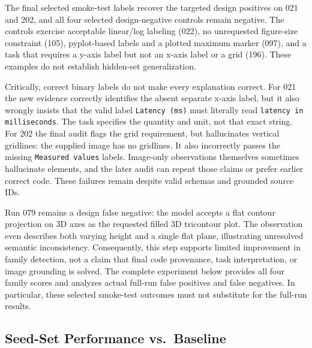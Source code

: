 \documentclass[11pt]{article}
\begin{document}
The final selected smoke-test labels recover the targeted design positives on
021 and 202, and
all four selected design-negative controls remain negative.
The controls exercise acceptable linear/log labeling (022), no unrequested
figure-size constraint (105), pyplot-based labels and a plotted maximum
marker (097), and a task that requires a y-axis label but not an x-axis label
or a grid (196). These examples do not establish hidden-set generalization.

Critically, correct binary labels do not make every explanation correct.
For 021 the new evidence correctly identifies the absent separate x-axis
label, but it also wrongly insists that the valid label \texttt{Latency (ms)}
must literally read \texttt{latency in milliseconds}. The task specifies the
quantity and unit, not that exact string.
For 202 the final audit flags the grid requirement, but hallucinates vertical
gridlines: the supplied image has no gridlines. It also incorrectly passes
the missing \texttt{Measured values} labels.
Image-only observations themselves sometimes hallucinate elements, and the
later audit can repeat those claims or prefer earlier correct code.
These failures remain despite valid schemas and grounded source IDs.

Run 079 remains a design false negative: the model accepts a flat contour
projection on 3D axes as the requested filled 3D tricontour plot.
The observation even describes both varying height and a single flat plane,
illustrating unresolved semantic inconsistency. Consequently, this step
supports limited improvement in family detection, not a claim that final
code provenance, task interpretation, or image grounding is solved.
The complete experiment below provides all four family scores and analyzes
actual full-run false positives and false negatives. In particular, these
selected smoke-test outcomes must not substitute for the full-run results.

\subsection{Seed-Set Performance vs.\ Baseline}
\label{sec:part2-performance}
\end{document}
